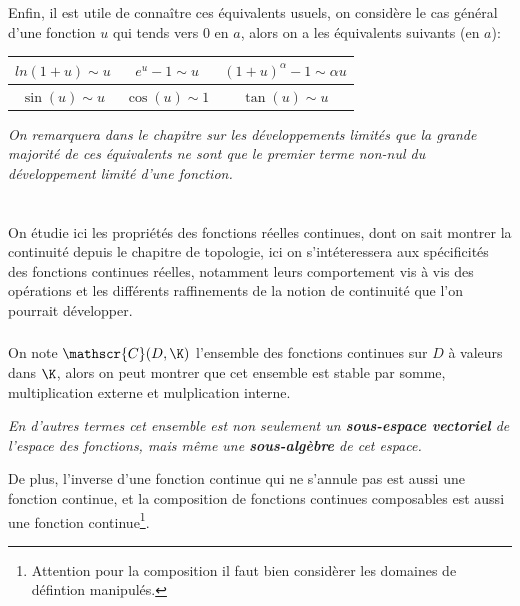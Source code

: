 Enfin, il est utile de connaître ces équivalents usuels, on considère le cas général d'une fonction \(u\) qui tends vers 0 en \(a\), alors on a les équivalents suivants (en \(a\)):

\begin{center}
   \renewcommand{\arraystretch}{1.5}%
   \setlength\arrayrulewidth{0.8pt}

   \begin{tabular}{| c | c | c |}
   \hline
   \(ln(1 + u) \sim u\) & \(e^u - 1 \sim u\) & \((1 + u)^\alpha - 1 \sim \alpha u\)\\ [0.5ex]
   \hline
   \(\sin(u) \sim u\) & \(\cos(u) \sim 1\) & \(\tan(u) \sim u\)\\ [0.5ex]
   \hline
   \end{tabular}
\end{center} 
\begin{center}
   \textit{
      On remarquera dans le chapitre sur les développements limités que la grande majorité de ces équivalents ne sont que le premier terme non-nul du développement limité d'une fonction.
   }
\end{center}
\chapter*{} %
On étudie ici les propriétés des fonctions réelles continues, dont on sait montrer la continuité depuis le chapitre de topologie, ici on s'intéteressera aux spécificités des fonctions continues réelles, notamment leurs comportement vis à vis des opérations et les différents raffinements de la notion de continuité que l'on pourrait développer.

\subsection*{}
On note \(\mathscr{C}(D, \K)\) l'ensemble des fonctions continues sur \(D\) à valeurs dans \(\K\), alors on peut montrer que cet ensemble est stable par somme, multiplication externe et mulplication interne.
\begin{center}
   \textit{
      En d'autres termes cet ensemble est non seulement un \textbf{sous-espace vectoriel} de l'espace des fonctions, mais même une \textbf{sous-algèbre} de cet espace.
   }
\end{center}
De plus, l'inverse d'une fonction continue qui ne s'annule pas est aussi une fonction continue, et la composition de fonctions continues composables est aussi une fonction continue\footnote[1]{Attention pour la composition il faut bien considèrer les domaines de défintion manipulés.}.
